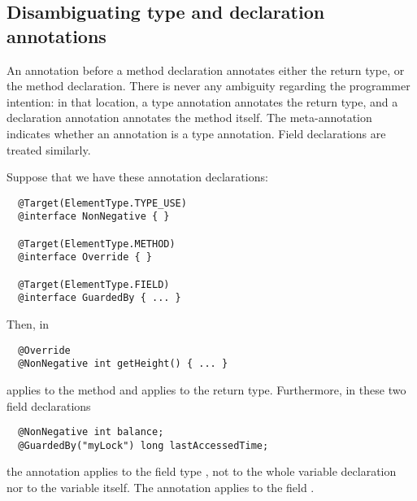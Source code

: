 \documentclass[10pt]{article}
\begin{document}


\subsection{Disambiguating type and declaration annotations\label{disambiguating}}

An annotation before a method declaration annotates either the return type,
or the method declaration.  There is never any ambiguity regarding the
programmer intention:  in that location, a type annotation annotates the
return type, and a declaration annotation annotates the method itself.  The
 meta-annotation indicates whether an annotation is a type
annotation.  Field declarations are treated similarly.



Suppose that we have these annotation declarations:
\begin{Verbatim}
  @Target(ElementType.TYPE_USE)
  @interface NonNegative { }

  @Target(ElementType.METHOD)
  @interface Override { }

  @Target(ElementType.FIELD)
  @interface GuardedBy { ... }
\end{Verbatim}
Then, in
\begin{Verbatim}
  @Override
  @NonNegative int getHeight() { ... }
\end{Verbatim}
 applies to the method and  applies
to the return type.
Furthermore, in these two field declarations
\begin{Verbatim}
  @NonNegative int balance;
  @GuardedBy("myLock") long lastAccessedTime;
\end{Verbatim}
the annotation  applies to the field type ,
not to the whole variable declaration nor to the variable 
itself.  The annotation  applies to the
field .
\end{document}
